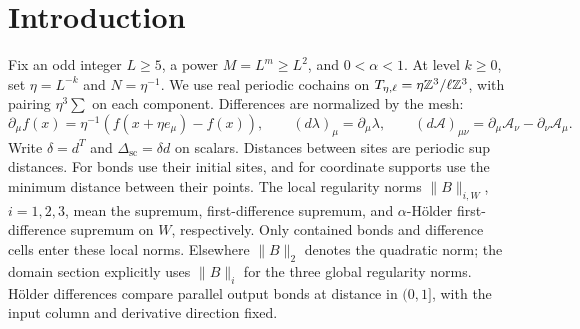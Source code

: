 \begin{abstract}
We construct an Abelian Maxwell block transformation on periodic
three-dimensional lattices. The constrained Landau minimizer has
exponentially decaying kernels, including first differences and
H\"older first differences, uniformly in the mesh and volume.
Local axial coordinates make the fluctuation form uniformly positive;
its positive inverse square root gives an exact Gaussian block
decomposition. We also prove curvature bounds in local real gauges,
locality of polynomially weakened kernels, explicit field-domain
inclusions, and compatibility of the exact operators with odd
periodic covers.
\end{abstract}
\maketitle
\tableofcontents
\section{Introduction}\label{sec:introduction}
Fix an odd integer \(L\ge5\), a power \(M=L^m\ge L^2\), and
\(0<\alpha<1\). At level \(k\ge0\), set
\(\eta=L^{-k}\) and \(N=\eta^{-1}\).
We use real periodic cochains on
\(T_{\eta,\ell}=\eta\mathbb Z^3/\ell\mathbb Z^3\), with pairing
\(\eta^3\sum\) on each component. Differences are normalized by
the mesh:
\[
 \partial_\mu f(x)=\eta^{-1}(f(x+\eta e_\mu)-f(x)),\qquad
 (d\lambda)_\mu=\partial_\mu\lambda,\qquad
 (d\mathscr A)_{\mu\nu}
   =\partial_\mu\mathscr A_\nu-\partial_\nu\mathscr A_\mu.
\]
Write \(\delta=d^T\) and \(\Delta_{\mathrm{sc}}=\delta d\)
on scalars. Distances between sites are periodic sup distances.
For bonds use their initial sites, and for coordinate supports use
the minimum distance between their points.
The local regularity norms \(\|B\|_{i,W}\), \(i=1,2,3\), mean
the supremum, first-difference supremum, and \(\alpha\)-H\"older
first-difference supremum on \(W\), respectively. Only contained
bonds and difference cells enter these local norms.
Elsewhere \(\|B\|_2\) denotes the quadratic norm; the domain
section explicitly uses \(\|B\|_i\) for the three global
regularity norms.
H\"older differences compare parallel output bonds at distance
in \((0,1]\), with the input column and derivative direction fixed.

